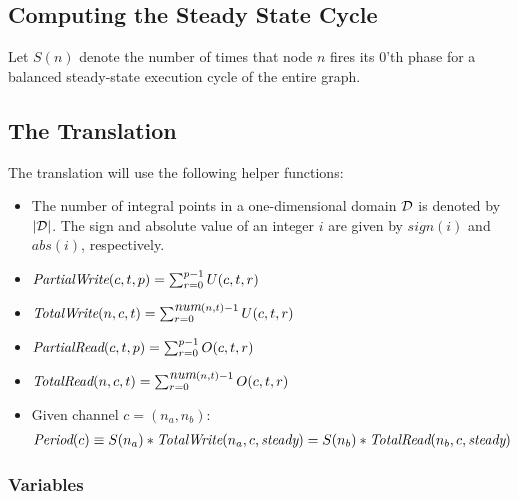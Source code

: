 \subsection{Computing the Steady State Cycle}

Let $S(n)$ denote the number of times that node $n$ fires its 0'th
phase for a balanced steady-state execution cycle of the entire graph.

\subsection{The Translation}

The translation will use the following helper functions:
\begin{itemize}

\item The number of integral points in a one-dimensional domain ${\cal
D}$ is denoted by $|{\cal D}|$.  The sign and absolute value of an
integer $i$ are given by $sign(i)$ and $abs(i)$, respectively.

\item $\mbox{\it PartialWrite}(c,t,p) = \sum_{r=0}^{p-1} U(c, t, r)$

\item $\mbox{\it TotalWrite}(n,c,t) = \sum_{r=0}^{\mbox{\it num}(n, t)-1} U(c, t, r)$

\item $\mbox{\it PartialRead}(c,t,p) = \sum_{r=0}^{p-1} O(c, t, r)$

\item $\mbox{\it TotalRead}(n,c,t) =  \sum_{r=0}^{\mbox{\it num}(n, t)-1} O(c, t, r)$

\item Given channel $c = (n_a, n_b)$:
\begin{align*}
\mbox{\it Period}(c) \equiv S(n_a) * \mbox{\it TotalWrite}(n_a, c, \mbox{\it steady}) = 
S(n_b) * \mbox{\it TotalRead}(n_b, c, \mbox{\it steady})
\end{align*}

\end{itemize}

\subsubsection{Variables}

